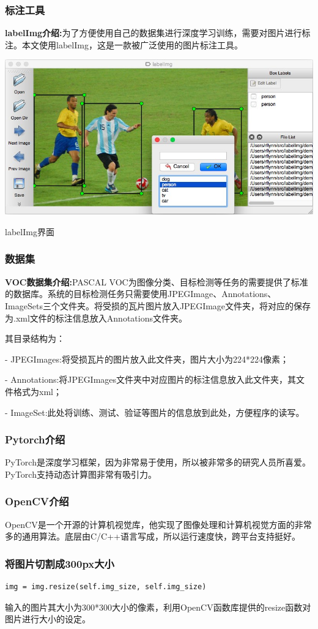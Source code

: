 \subsubsection{标注工具}
\textbf{labelImg介绍:}为了方便使用自己的数据集进行深度学习训练，需要对图片进行标注。本文使用labelImg，这是一款被广泛使用的图片标注工具。
\begin{uscfigure}
	\includegraphics[width=\textwidth]{./Pictures/labelimg.jpg}	
	\caption{labelImg界面}
\end{uscfigure}
\subsubsection{数据集}
\textbf{VOC数据集介绍:}PASCAL VOC为图像分类、目标检测等任务的需要提供了标准的数据库。系统的目标检测任务只需要使用JPEGImage、Annotations、ImageSets三个文件夹。将受损的瓦片图片放入JPEGImage文件夹，将对应的保存为.xml文件的标注信息放入Annotations文件夹。

其目录结构为：

- JPEGImages:将受损瓦片的图片放入此文件夹，图片大小为224*224像素；

- Annotations:将JPEGImages文件夹中对应图片的标注信息放入此文件夹，其文件格式为xml；

- ImageSet:此处将训练、测试、验证等图片的信息放到此处，方便程序的读写。


\subsubsection{Pytorch介绍}
PyTorch是深度学习框架，因为非常易于使用，所以被非常多的研究人员所喜爱。PyTorch支持动态计算图非常有吸引力。
\subsubsection{OpenCV介绍}
OpenCV是一个开源的计算机视觉库，他实现了图像处理和计算机视觉方面的非常多的通用算法。底层由C/C++语言写成，所以运行速度快，跨平台支持挺好。
\subsubsection{将图片切割成300px大小}
\begin{lstlisting}[caption={图像切割}]
img = img.resize(self.img_size, self.img_size)
\end{lstlisting}

输入的图片其大小为300*300大小的像素，利用OpenCV函数库提供的resize函数对图片进行大小的设定。